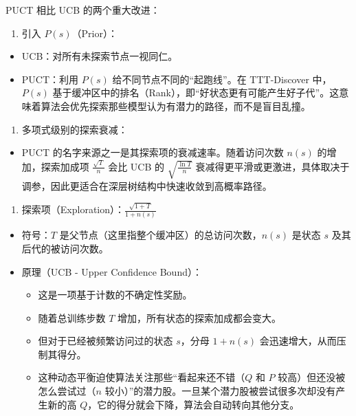 PUCT 相比 UCB 的两个重大改进：

\begin{enumerate}
\def\labelenumi{\arabic{enumi}.}
\tightlist
\item
  引入 \(P(s)\)（Prior）：
\end{enumerate}

\begin{itemize}
\tightlist
\item
  UCB：对所有未探索节点一视同仁。
\item
  PUCT：利用 \(P(s)\) 给不同节点不同的``起跑线''。在 TTT-Discover 中，\(P(s)\) 基于缓冲区中的排名（Rank），即``好状态更有可能产生好子代''。这意味着算法会优先探索那些模型认为有潜力的路径，而不是盲目乱撞。
\end{itemize}

\begin{enumerate}
\def\labelenumi{\arabic{enumi}.}
\setcounter{enumi}{1}
\tightlist
\item
  多项式级别的探索衰减：
\end{enumerate}

\begin{itemize}
\tightlist
\item
  PUCT 的名字来源之一是其探索项的衰减速率。随着访问次数 \(n(s)\) 的增加，探索加成项 \(\frac{\sqrt{T}}{n}\) 会比 UCB 的 \(\sqrt{\frac{\ln T}{n}}\) 衰减得更平滑或更激进，具体取决于调参，因此更适合在深层树结构中快速收敛到高概率路径。
\end{itemize}

\begin{enumerate}
\def\labelenumi{\arabic{enumi}.}
\setcounter{enumi}{2}
\tightlist
\item
  探索项（Exploration）：\(\frac{\sqrt{1+T}}{1+n(s)}\)
\end{enumerate}

\begin{itemize}
\tightlist
\item
  符号：\(T\) 是父节点（这里指整个缓冲区）的总访问次数，\(n(s)\) 是状态 \(s\) 及其后代的被访问次数。
\item
  原理（UCB - Upper Confidence Bound）：

  \begin{itemize}
  \tightlist
  \item
    这是一项基于计数的不确定性奖励。
  \item
    随着总训练步数 \(T\) 增加，所有状态的探索加成都会变大。
  \item
    但对于已经被频繁访问过的状态 \(s\)，分母 \(1+n(s)\) 会迅速增大，从而压制其得分。
  \item
    这种动态平衡迫使算法关注那些``看起来还不错（\(Q\) 和 \(P\) 较高）但还没被怎么尝试过（\(n\) 较小）''的潜力股。一旦某个潜力股被尝试很多次却没有产生新的高 \(Q\)，它的得分就会下降，算法会自动转向其他分支。
  \end{itemize}
\end{itemize}

